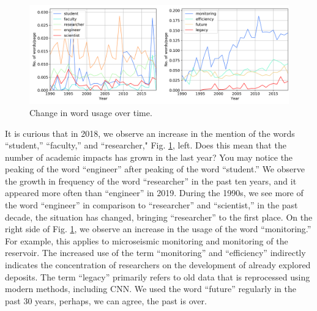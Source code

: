 \documentclass[geosciences,article,submit,moreauthors,pdftex]{Definitions/mdpi}
\begin{document}
\begin{figure}[ht!]
\includegraphics[width=\textwidth]{sigrams_int.png}
\caption{Change in word usage over time.}
\label{stu_faculty_mon}
\end{figure}


It is curious that in 2018, we observe an increase in the mention of the words ``student,'' ``faculty,'' and ``researcher," Fig. \ref{stu_faculty_mon}, left. Does this mean that the number of academic impacts has grown in the last year? You may notice the peaking of the word ``engineer'' after peaking of the word ``student.'' We observe the growth in frequency of the word ``researcher'' in the past ten years, and it appeared more often than ``engineer'' in 2019. During the 1990s, we see more of the word ``engineer'' in comparison to ``researcher'' and ``scientist,'' in the past decade, the situation has changed, bringing ``researcher'' to the first place. On the right side of Fig. \ref{stu_faculty_mon}, we observe an increase in the usage of the word ``monitoring.'' For example, this applies to microseismic monitoring and monitoring of the reservoir. The increased use of the term ``monitoring'' and ``efficiency'' indirectly indicates the concentration of researchers on the development of already explored deposits. The term ``legacy'' primarily refers to old data that is reprocessed using modern methods, including CNN. We used the word ``future'' regularly in the past 30 years, perhaps, we can agree, the past is over.
\end{document}
